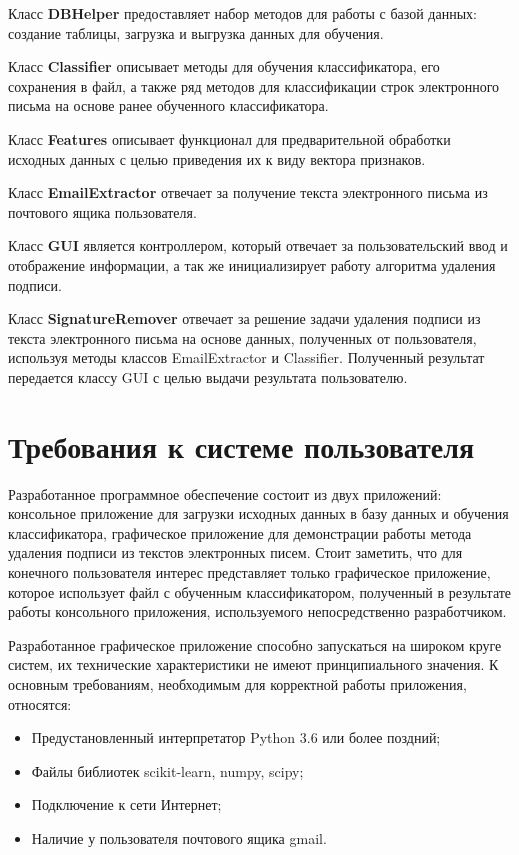 Класс \textbf{DBHelper} предоставляет набор методов для работы с базой данных: создание таблицы, загрузка и выгрузка данных для обучения.

Класс \textbf{Classifier} описывает методы для обучения классификатора, его сохранения в файл, а также ряд методов для классификации строк электронного письма на основе ранее обученного классификатора.

Класс \textbf{Features} описывает функционал для предварительной обработки исходных данных с целью приведения их к виду вектора признаков.

Класс \textbf{EmailExtractor} отвечает за получение текста электронного письма из почтового ящика пользователя.

Класс \textbf{GUI} является контроллером, который отвечает за пользовательский ввод и отображение информации, а так же инициализирует работу алгоритма удаления подписи.

Класс \textbf{SignatureRemover} отвечает за решение задачи удаления подписи из текста электронного письма на основе данных, полученных от пользователя, используя методы классов EmailExtractor и Classifier. Полученный результат передается классу GUI с целью выдачи результата пользователю.

\section{Требования к системе пользователя}

Разработанное программное обеспечение состоит из двух приложений: консольное приложение для загрузки исходных данных в базу данных и обучения классификатора, графическое приложение для демонстрации работы метода удаления подписи из текстов электронных писем.
Стоит заметить, что для конечного пользователя интерес представляет только графическое приложение, которое использует файл с обученным классификатором, полученный в результате работы консольного приложения, используемого непосредственно разработчиком.

Разработанное графическое приложение способно запускаться на широком круге систем, их технические характеристики не имеют принципиального значения.  К основным требованиям, необходимым для корректной работы приложения, относятся:
\begin{itemize}
	\item Предустановленный интерпретатор Python 3.6 или более поздний;
	\item Файлы библиотек scikit-learn, numpy, scipy;
	\item Подключение к сети Интернет;
	\item Наличие у пользователя почтового ящика gmail.
\end{itemize}

